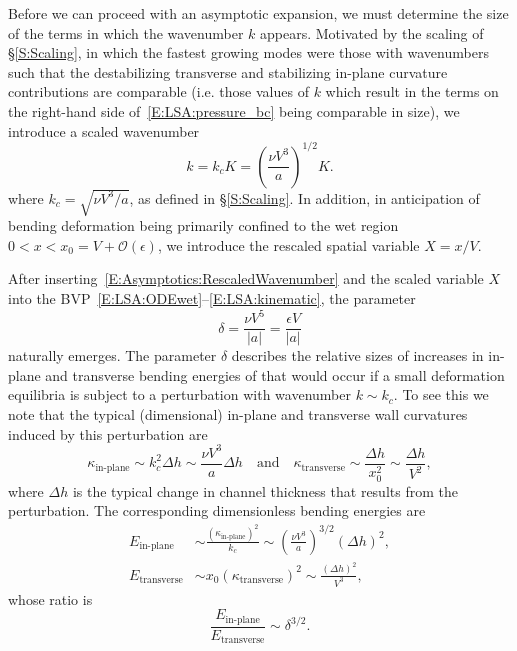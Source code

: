 \documentclass{jfm}
\begin{document}
Before we can proceed with an asymptotic expansion, we must determine the size of the terms in which the wavenumber $k$ appears. Motivated by the scaling of \S\ref{S:Scaling}, in which the fastest growing modes were those with wavenumbers such that the destabilizing transverse and stabilizing in-plane curvature contributions are comparable (i.e. those values of $k$ which result in the terms on the right-hand side of~\eqref{E:LSA:pressure_bc} being comparable in size), we introduce a scaled wavenumber
\begin{equation}\label{E:Asymptotics:RescaledWavenumber}
k = k_c K = \left(\frac{\nu V^3}{a}\right)^{1/2} K.
\end{equation}
where $k_c = \sqrt{\nu V^3 /a}$, as defined in \S\ref{S:Scaling}. In addition, in anticipation of bending deformation being primarily confined to the wet region $0 < x < x_0 = V + \mathcal{O}(\epsilon)$, we introduce the rescaled spatial variable $X = x/V$. 

After inserting~\eqref{E:Asymptotics:RescaledWavenumber} and the scaled variable $X$ into the BVP~\eqref{E:LSA:ODEwet}--\eqref{E:LSA:kinematic}, the parameter
\begin{equation}\label{E:Asymptotics:}
\delta= \frac{\nu V^5}{|a|} = \frac{\epsilon V }{|a|}
\end{equation}
naturally emerges. The parameter $\delta$ describes the relative sizes of increases in in-plane and transverse bending energies of that would occur if a small deformation equilibria is subject to a perturbation with wavenumber $k \sim k_c$. To see this we note that the typical (dimensional) in-plane and transverse wall curvatures induced by this perturbation are
\begin{equation}
\kappa_{\text{in-plane}} \sim k_c^2 \Delta h \sim \frac{\nu V^3}{a} \Delta h \quad \text{and}\quad \kappa_{\text{transverse}} \sim \frac{\Delta h}{x_0^2} \sim  \frac{\Delta h}{V^2},
\end{equation}
where $\Delta h$ is the typical change in channel thickness that results from the perturbation. The corresponding dimensionless bending energies are
\begin{align}
E_{\text{in-plane}} &\sim \frac{\left(\kappa_{\text{in-plane}}\right)^2}{k_c} \sim \left( \frac{\nu V^3}{a}\right)^{3/2}(\Delta h)^2,\\ 
E_{\text{transverse}} &\sim x_0 \left(\kappa_{\text{transverse}}\right)^2 \sim \frac{(\Delta h)^2}{V^3},
\end{align}
whose ratio is
\begin{equation}
\frac{E_{\text{in-plane}}}{ E_{\text{transverse}}}
\sim \delta^{3/2}.
\end{equation}
\end{document}
